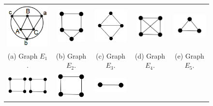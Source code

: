  \begin{figure}[htb]	
 
   \centering
  \begin{tabular}{  c c c c  c}
    \includegraphics[width=3cm]{img/octaedro.png} 
    & 
    \includegraphics[width=1.5cm]{img/ex3.png} 
    & 
    \includegraphics[width=2cm]{img/diamondNoLabel.png} 
    & 
    \includegraphics[width=1.5cm]{img/k4.png} 
    & 
    \includegraphics[width=2cm]{img/k3.png} 
    \\
    \footnotesize 
    (a)  \footnotesize Graph $E_1$. 
    & 
    \footnotesize (b) Graph $E_2$.
    & 
    \footnotesize (c) Graph $E_3$.
    & 
    \footnotesize (d) Graph $E_4$.
    & 
    \footnotesize (e) Graph $E_5$.
    \\%
        \includegraphics[width=2.5cm]{img/2c4.png} 
    & 
    \includegraphics[width=1.5cm]{img/c4e.png} 
    & 
    \includegraphics[width=1.8cm]{img/k2.png} 

\end{tabular}
\end{figure}
